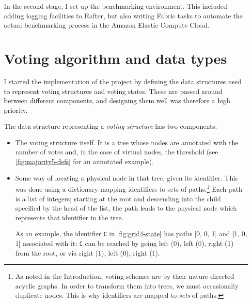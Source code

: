 \documentclass[12pt,chapterprefix=true,toc=bibliography,numbers=noendperiod,
               footnotes=multiple,twoside]{scrreprt}
\begin{document}
In the second stage, I set up the benchmarking environment. This included adding logging facilities to Rafter, but also writing Fabric tasks to automate the actual benchmarking process in the Amazon Elastic Compute Cloud.


\section{Voting algorithm and data types}
\label{sc:voting-algo}

I started the implementation of the project by defining the data structures used to represent voting structures and voting states. These are passed around between different components, and designing them well was therefore a high priority.

The data structure representing a \emph{voting structure} has two components:

\begin{itemize}
    \item The voting structure itself. It is a tree whose nodes are annotated with the number of votes and, in the case of virtual nodes, the threshold (see \cref{fig:majority5-defs} for an annotated example).
    \item Some way of locating a physical node in that tree, given its identifier. This was done using a dictionary mapping identifiers to sets of paths.\footnote{As noted in the Introduction, voting schemes are by their nature directed acyclic graphs. In order to transform them into trees, we must occasionally duplicate nodes. This is why identifiers are mapped to \emph{sets} of paths.} Each path is a list of integers; starting at the root and descending into the child specified by the head of the list, the path leads to the physical node which represents that identifier in the tree.

        As an example, the identifier \texttt{C} in \cref{fig:grid4-state} has paths [0, 0, 1] and [1, 0, 1] associated with it: \texttt{C} can be reached by going left (0), left (0), right (1) from the root, or via right (1), left (0), right (1).
\end{itemize}
\end{document}
